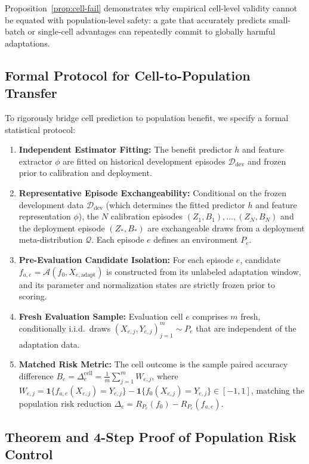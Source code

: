 Proposition~\ref{prop:cell-fail} demonstrates why empirical cell-level validity cannot be equated with
population-level safety: a gate that accurately predicts small-batch or single-cell advantages can repeatedly
commit to globally harmful adaptations.

\subsection{Formal Protocol for Cell-to-Population Transfer}
\label{app:formal-transfer-protocol}

To rigorously bridge cell prediction to population benefit, we specify a formal statistical protocol:
\begin{enumerate}[label=\textbf{(P\arabic*)}]
 \item \textbf{Independent Estimator Fitting:} The benefit predictor $h$ and feature extractor $\phi$ are fitted
 on historical development episodes $\mathcal D_{\mathrm{dev}}$ and frozen prior to calibration and deployment.
 \item \textbf{Representative Episode Exchangeability:} Conditional on the frozen development
 data $\mathcal D_{\mathrm{dev}}$ (which determines the fitted predictor $h$ and feature representation $\phi$),
 the $N$ calibration episodes $(Z_1, B_1), \dots, (Z_N, B_N)$ and the deployment episode $(Z_*, B_*)$
 are exchangeable draws from a deployment meta-distribution $\mathcal Q$. Each episode $e$ defines an environment $P_e$.
 \item \textbf{Pre-Evaluation Candidate Isolation:} For each episode $e$, candidate $f_{a,e} = \mathcal A(f_0, X_{e, \mathrm{adapt}})$
 is constructed from its unlabeled adaptation window, and its parameter and normalization states are strictly
 frozen prior to scoring.
 \item \textbf{Fresh Evaluation Sample:} Evaluation cell $e$ comprises $m$ fresh, conditionally i.i.d.\ draws
 $(X_{e,j}, Y_{e,j})_{j=1}^m \sim P_e$ that are independent of the adaptation data.
 \item \textbf{Matched Risk Metric:} The cell outcome is the sample paired accuracy difference
 $B_e = \Delta_e^{\mathrm{cell}} = \frac{1}{m}\sum_{j=1}^m W_{e,j}$, where
 $W_{e,j} = \mathbf 1\{f_{a,e}(X_{e,j}) = Y_{e,j}\} - \mathbf 1\{f_0(X_{e,j}) = Y_{e,j}\} \in [-1, 1]$,
 matching the population risk reduction $\Delta_e = R_{P_e}(f_0) - R_{P_e}(f_{a,e})$.
\end{enumerate}

\subsection{Theorem and 4-Step Proof of Population Risk Control}
\label{app:transfer-proof}

